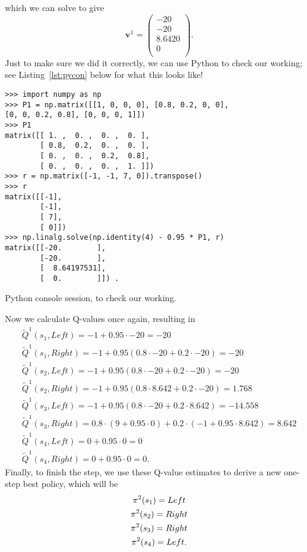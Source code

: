 \documentclass[a4paper]{article}
\begin{document}
which we can solve to give
\begin{equation*}
  \mathbf{v}^1 = \begin{pmatrix}
    -20 \\ -20 \\ 8.6420 \\ 0 \\
  \end{pmatrix} .
\end{equation*}
Just to make sure we did it correctly, we can use Python to check our
working;
see Listing~\ref{lst:pycon} below for what this looks like!
\clearpage

\begin{listing}[t!]
  \begin{verbatim}
>>> import numpy as np
>>> P1 = np.matrix([[1, 0, 0, 0], [0.8, 0.2, 0, 0],
[0, 0, 0.2, 0.8], [0, 0, 0, 1]])
>>> P1
matrix([[ 1. ,  0. ,  0. ,  0. ],
        [ 0.8,  0.2,  0. ,  0. ],
        [ 0. ,  0. ,  0.2,  0.8],
        [ 0. ,  0. ,  0. ,  1. ]])
>>> r = np.matrix([-1, -1, 7, 0]).transpose()
>>> r
matrix([[-1],
        [-1],
        [ 7],
        [ 0]])
>>> np.linalg.solve(np.identity(4) - 0.95 * P1, r)
matrix([[-20.        ],
        [-20.        ],
        [  8.64197531],
        [  0.        ]]) .
  \end{verbatim}
  \caption{Python console session, to check our working.}
  \label{lst:pycon}
\end{listing}

Now we calculate Q-values once again, resulting in
\begin{gather*}
  \widetilde{Q}^1(s_1, Left)  = -1 + 0.95 \cdot -20 = -20 \\
  \widetilde{Q}^1(s_1, Right) = -1 + 0.95 (0.8 \cdot -20 + 0.2 \cdot -20) = -20 \\
  \widetilde{Q}^1(s_2, Left)  = -1 + 0.95 (0.8 \cdot -20 + 0.2 \cdot -20) = -20 \\
  \widetilde{Q}^1(s_2, Right) = -1 + 0.95 (0.8 \cdot 8.642 + 0.2 \cdot -20) = 1.768 \\
  \widetilde{Q}^1(s_3, Left)  = -1 + 0.95 (0.8 \cdot -20 + 0.2 \cdot 8.642) = -14.558 \\
  \widetilde{Q}^1(s_3, Right) = 0.8 \cdot (9 + 0.95 \cdot 0) + 0.2 \cdot (-1 + 0.95 \cdot 8.642) = 8.642 \\
  \widetilde{Q}^1(s_4, Left)  = 0 + 0.95 \cdot 0 = 0 \\
  \widetilde{Q}^1(s_4, Right) = 0 + 0.95 \cdot 0 = 0 .
\end{gather*}
Finally, to finish the step, we use these Q-value estimates to derive a new one-step best policy,
which will be
\begin{gather*}
  \pi^2(s_1) = Left \\
  \pi^2(s_2) = Right \\
  \pi^2(s_3) = Right \\
  \pi^2(s_4) = Left .
\end{gather*}
\end{document}
